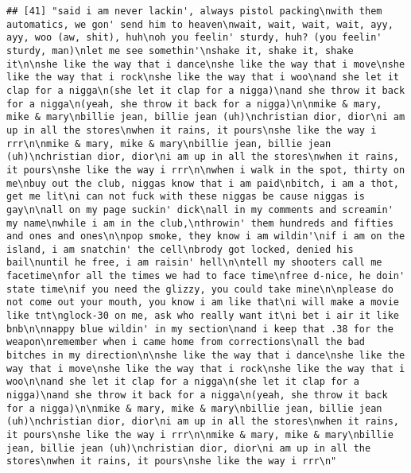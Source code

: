 \documentclass[]{article}
\begin{document}
\begin{verbatim}
## [41] "said i am never lackin', always pistol packing\nwith them automatics, we gon' send him to heaven\nwait, wait, wait, wait, ayy, ayy, woo (aw, shit), huh\noh you feelin' sturdy, huh? (you feelin' sturdy, man)\nlet me see somethin'\nshake it, shake it, shake it\n\nshe like the way that i dance\nshe like the way that i move\nshe like the way that i rock\nshe like the way that i woo\nand she let it clap for a nigga\n(she let it clap for a nigga)\nand she throw it back for a nigga\n(yeah, she throw it back for a nigga)\n\nmike & mary, mike & mary\nbillie jean, billie jean (uh)\nchristian dior, dior\ni am up in all the stores\nwhen it rains, it pours\nshe like the way i rrr\n\nmike & mary, mike & mary\nbillie jean, billie jean (uh)\nchristian dior, dior\ni am up in all the stores\nwhen it rains, it pours\nshe like the way i rrr\n\nwhen i walk in the spot, thirty on me\nbuy out the club, niggas know that i am paid\nbitch, i am a thot, get me lit\ni can not fuck with these niggas be cause niggas is gay\n\nall on my page suckin' dick\nall in my comments and screamin' my name\nwhile i am in the club,\nthrowin' them hundreds and fifties and ones and ones\n\npop smoke, they know i am wildin'\nif i am on the island, i am snatchin' the cell\nbrody got locked, denied his bail\nuntil he free, i am raisin' hell\n\ntell my shooters call me facetime\nfor all the times we had to face time\nfree d-nice, he doin' state time\nif you need the glizzy, you could take mine\n\nplease do not come out your mouth, you know i am like that\ni will make a movie like tnt\nglock-30 on me, ask who really want it\ni bet i air it like bnb\n\nnappy blue wildin' in my section\nand i keep that .38 for the weapon\nremember when i came home from corrections\nall the bad bitches in my direction\n\nshe like the way that i dance\nshe like the way that i move\nshe like the way that i rock\nshe like the way that i woo\n\nand she let it clap for a nigga\n(she let it clap for a nigga)\nand she throw it back for a nigga\n(yeah, she throw it back for a nigga)\n\nmike & mary, mike & mary\nbillie jean, billie jean (uh)\nchristian dior, dior\ni am up in all the stores\nwhen it rains, it pours\nshe like the way i rrr\n\nmike & mary, mike & mary\nbillie jean, billie jean (uh)\nchristian dior, dior\ni am up in all the stores\nwhen it rains, it pours\nshe like the way i rrr\n"                                                                                                                                                                                                                                                                                                                                                                                                                                                                                                                                                                                                                                                                                                                                                                                                                                                                                                                                                                                        
\end{verbatim}
\end{document}
